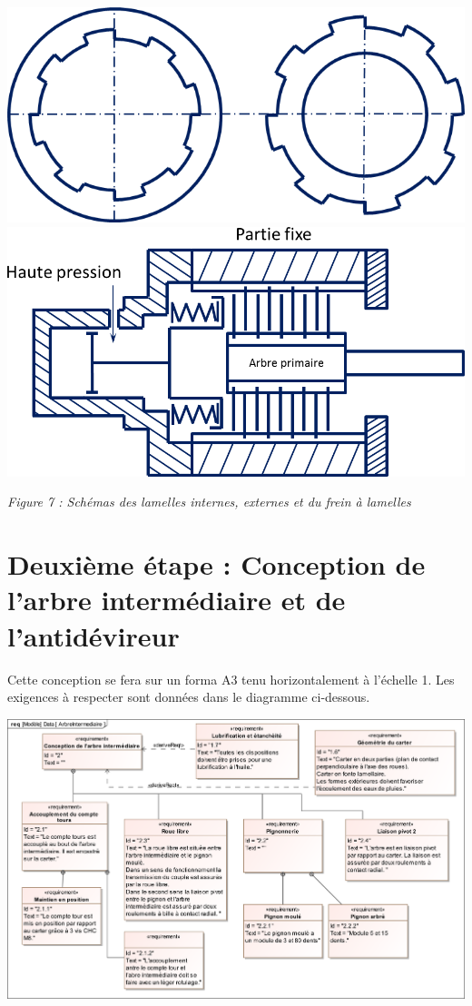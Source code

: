 \documentclass[10pt]{article}
\begin{document}
\begin{center}
\includegraphics[width=.4\textwidth]{images/lamelles}\hfill
\includegraphics[width=.45\textwidth]{images/frein}

\textit{Figure 7 : Schémas des lamelles internes, externes et du frein à lamelles}
\end{center}

\section{Deuxième étape : Conception de l'arbre intermédiaire et de l'antidévireur}

Cette conception se fera sur un forma A3 tenu horizontalement à l'échelle 1. Les exigences à respecter sont données dans le diagramme ci-dessous.

\begin{center}
\includegraphics[width=\textwidth]{images/SysML/ArbreIntermediaire}
\end{center}
\end{document}
